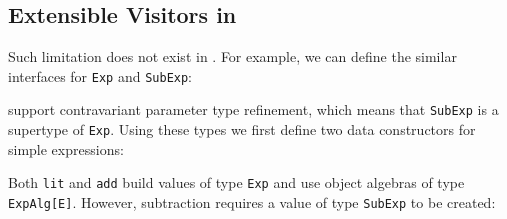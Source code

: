 \begin{comment}
However,
such subtyping relation does not fit well in Scala because inheritance implies
subtyping in such languages \footnote{It is still possible to encode
  contravariant parameter types in Scala but doing so would require some
  technique.\bruno{what technique?}}. As \lstinline{SubExp[E]} extends
\lstinline{Exp[E]}, the former becomes a subtype of the latter. This suffers
from the ``Inheritance is Not Subtyping'' problem.
\end{comment}

\subsection{Extensible Visitors in \name}
Such limitation does not exist in \name. For example, we can define the similar
interfaces for \lstinline{Exp} and \lstinline{SubExp}:
\begin{comment}
  \begin{lstlisting}{language=F2J}
    type Exp    = {
      accept: forall A. ExpAlg[A] -> A
    };
    type SubExp = {
      accept: forall A. SubExpAlg[A] -> A
    };
  \end{lstlisting}
\end{comment}
\name support contravariant parameter type refinement, which means that
\lstinline{SubExp} is a supertype of \lstinline{Exp}. Using these
types we first define two data constructors for simple expressions:
\begin{comment}
  \begin{lstlisting}{language=F2J}
    let lit (n: Int): Exp = {
      accept = /\E -> \(f: ExpAlg[E]) -> f.lit n
    };
    let add (e1: Exp) (e2: Exp): Exp = {
      accept = /\E -> \(f: ExpAlg[E]) -> 
      f.add (e1.accept[E] f) (e2.accept[E] f)
    };
  \end{lstlisting}
\end{comment}

\noindent Both \lstinline{lit} and \lstinline{add} build values of type
\lstinline{Exp} and use object algebras of type \lstinline{ExpAlg[E]}. 
However, subtraction requires a value of type \lstinline{SubExp} to be created:
\begin{comment}
  \begin{lstlisting}{language=F2J}
    let sub (e1: SubExp) (e2: SubExp): SubExp ={ 
      accept = /\E -> \(f : SubExpAlg[E]) ->
      f.sub (e1.accept[E] f) (e2.accept[E] f) 
    };
  \end{lstlisting}
\end{comment}

